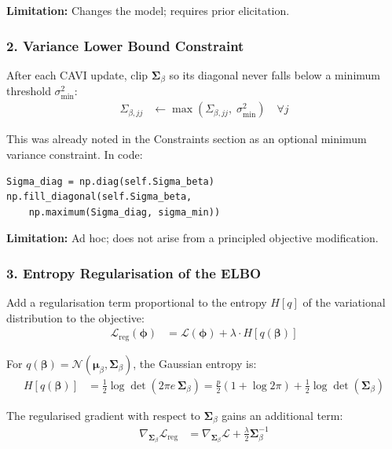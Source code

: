 \documentclass[11pt]{article}
\begin{document}
\textbf{Limitation:} Changes the model; requires prior elicitation.

\subsubsection*{2. Variance Lower Bound Constraint}

After each CAVI update, clip $\bm{\Sigma}_\beta$ so its diagonal never falls below a minimum threshold $\sigma^2_{\min}$:
\begin{align}
  \Sigma_{\beta,jj} &\leftarrow \max\!\left(\Sigma_{\beta,jj},\; \sigma^2_{\min}\right) \quad \forall j
\end{align}

This was already noted in the Constraints section as an optional minimum variance constraint. In code:
\begin{verbatim}
Sigma_diag = np.diag(self.Sigma_beta)
np.fill_diagonal(self.Sigma_beta,
    np.maximum(Sigma_diag, sigma_min))
\end{verbatim}

\textbf{Limitation:} Ad hoc; does not arise from a principled objective modification.

\subsubsection*{3. Entropy Regularisation of the ELBO}

Add a regularisation term proportional to the entropy $H[q]$ of the variational distribution to the objective:
\begin{align}
  \mathcal{L}_{\text{reg}}(\bm{\phi}) &= \mathcal{L}(\bm{\phi}) + \lambda \cdot H[q(\bm{\beta})]
\end{align}

For $q(\bm{\beta}) = \mathcal{N}(\bm{\mu}_\beta, \bm{\Sigma}_\beta)$, the Gaussian entropy is:
\begin{align}
  H[q(\bm{\beta})] &= \frac{1}{2} \log \det(2\pi e\, \bm{\Sigma}_\beta)
               = \frac{p}{2}(1 + \log 2\pi) + \frac{1}{2}\log\det(\bm{\Sigma}_\beta)
\end{align}

The regularised gradient with respect to $\bm{\Sigma}_\beta$ gains an additional term:
\begin{align}
  \nabla_{\bm{\Sigma}_\beta} \mathcal{L}_{\text{reg}} &= \nabla_{\bm{\Sigma}_\beta} \mathcal{L} + \frac{\lambda}{2} \bm{\Sigma}_\beta^{-1}
\end{align}
\end{document}

